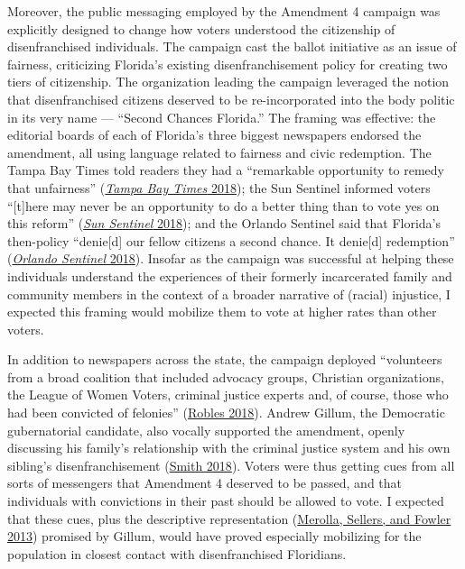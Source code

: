 \documentclass[
  12pt,
]{article}
\begin{document}
Moreover, the public messaging employed by the Amendment 4 campaign was explicitly designed to change how voters understood the citizenship of disenfranchised individuals. The campaign cast the ballot initiative as an issue of fairness, criticizing Florida's existing disenfranchisement policy for creating two tiers of citizenship. The organization leading the campaign leveraged the notion that disenfranchised citizens deserved to be re-incorporated into the body politic in its very name --- ``Second Chances Florida.'' The framing was effective: the editorial boards of each of Florida's three biggest newspapers endorsed the amendment, all using language related to fairness and civic redemption. The Tampa Bay Times told readers they had a ``remarkable opportunity to remedy that unfairness'' (\protect\hyperlink{ref-tampabaytimes2018}{\emph{Tampa Bay Times} 2018}); the Sun Sentinel informed voters ``{[}t{]}here may never be an opportunity to do a better thing than to vote yes on this reform'' (\protect\hyperlink{ref-SunSentinelEditorial2018}{\emph{Sun Sentinel} 2018}); and the Orlando Sentinel said that Florida's then-policy ``denie{[}d{]} our fellow citizens a second chance. It denie{[}d{]} redemption'' (\protect\hyperlink{ref-ORLANDOSENTINEL2018}{\emph{Orlando Sentinel} 2018}). Insofar as the campaign was successful at helping these individuals understand the experiences of their formerly incarcerated family and community members in the context of a broader narrative of (racial) injustice, I expected this framing would mobilize them to vote at higher rates than other voters.

In addition to newspapers across the state, the campaign deployed ``volunteers from a broad coalition that included advocacy groups, Christian organizations, the League of Women Voters, criminal justice experts and, of course, those who had been convicted of felonies'' (\protect\hyperlink{ref-Robles2018}{Robles 2018}). Andrew Gillum, the Democratic gubernatorial candidate, also vocally supported the amendment, openly discussing his family's relationship with the criminal justice system and his own sibling's disenfranchisement (\protect\hyperlink{ref-Smith2018}{Smith 2018}). Voters were thus getting cues from all sorts of messengers that Amendment 4 deserved to be passed, and that individuals with convictions in their past should be allowed to vote. I expected that these cues, plus the descriptive representation (\protect\hyperlink{ref-Merolla2013}{Merolla, Sellers, and Fowler 2013}) promised by Gillum, would have proved especially mobilizing for the population in closest contact with disenfranchised Floridians.
\end{document}
